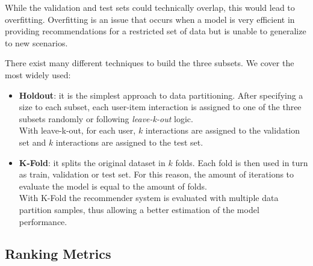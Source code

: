 While the validation and test sets could technically overlap, this would lead to overfitting. Overfitting is an issue that occurs when a model is very efficient in providing recommendations for a restricted set of data but is unable to generalize to new scenarios.\par
There exist many different techniques to build the three subsets. We cover the most widely used:
\begin{itemize}
\item \textbf{Holdout}: it is the simplest approach to data partitioning. After specifying a size to each subset, each user-item interaction is assigned to one of the three subsets randomly or following \textit{leave-k-out} logic.\\
With leave-k-out, for each user, $k$ interactions are assigned to the validation set and $k$ interactions are assigned to the test set.
\item \textbf{K-Fold}: it splits the original dataset in $k$ folds. Each fold is then used in turn as train, validation or test set. For this reason, the amount of iterations to evaluate the model is equal to the amount of folds.\\
With K-Fold the recommender system is evaluated with multiple data partition samples, thus allowing a better estimation of the model performance.
\end{itemize}


\subsection{Ranking Metrics}

